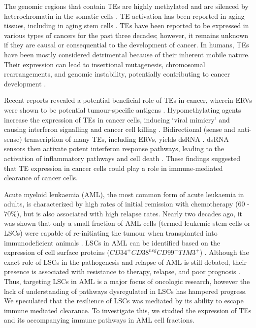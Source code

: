 The genomic regions that contain TEs are highly methylated and are silenced by heterochromatin in the somatic cells \cite{Schulz2006, Groh2017}. TE activation has been reported in aging tissues, including in aging stem cells \cite{Wang2011,Sun2014}. TEs have been reported to be expressed in various types of cancers for the past three decades; however, it remains unknown if they are causal or consequential to the development of cancer. In humans, TEs have been mostly considered detrimental because of their inherent mobile nature. Their expression can lead to insertional mutagenesis, chromosomal rearrangements, and genomic instability, potentially contributing to cancer development \cite{Belancio2015, Kemp2015, Mills2007, Luzhna2015}. 

Recent reports revealed a potential beneficial role of TEs in cancer, wherein ERVs were shown to be potential tumour-specific antigens \cite{Mullins2012}. Hypomethylating agents increase the expression of TEs in cancer cells, inducing `viral mimicry' and causing interferon signalling and cancer cell killing \cite{Chiappinelli2015, Roulois2015}. Bidirectional (sense and anti-sense) transcription of many TEs, including ERVs, yields dsRNA \cite{Lehner2002, Yelin2003}. dsRNA sensors then activate potent interferon response pathways, leading to the activation of inflammatory pathways and cell death \cite{Chiappinelli2015, Roulois2015}. These findings suggested that TE expression in cancer cells could play a role in immune-mediated clearance of cancer cells.

Acute myeloid leukaemia (AML), the most common form of acute leukaemia in adults, is characterized by high rates of initial remission with chemotherapy (60 - 70\%), but is also associated with high relapse rates. Nearly two decades ago, it was shown that only a small fraction of AML cells (termed leukemic stem cells or LSCs) were capable of re-initiating the tumour when transplanted into immunodeficient animals \cite{Bonnet1997}. LSCs in AML can be identified based on the expression of cell surface proteins ($CD34^+CD38^{neg}CD99^+TIM3^+$) \cite{Corces2016}. Although the exact role of LSCs in the pathogenesis and relapse of AML is still debated, their presence is associated with resistance to therapy, relapse, and poor prognosis \cite{Reinisch2015}. Thus, targeting LSCs in AML is a major focus of oncologic research, however the lack of understanding of pathways dysregulated in LSCs has hampered progress. We speculated that the resilience of LSCs was mediated by its ability to escape immune mediated clearance. To investigate this, we studied the expression of TEs and its accompanying immune pathways in AML cell fractions.

